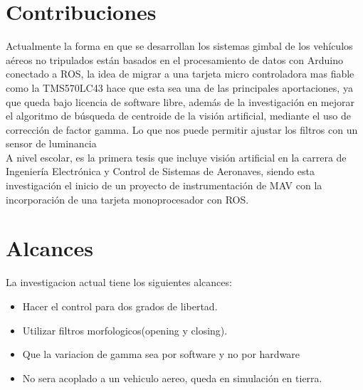 \section{Contribuciones}
Actualmente la forma en que se desarrollan los sistemas gimbal de los vehículos aéreos no tripulados están basados en el procesamiento
de datos con Arduino conectado a ROS, la idea de migrar a una tarjeta micro controladora mas fiable como la TMS570LC43 hace que esta sea una
de las principales aportaciones, ya que queda bajo licencia de software libre, además de la investigación en mejorar el algoritmo de búsqueda
de centroide de la visión artificial, mediante el uso de corrección de factor gamma. Lo que nos puede permitir ajustar los filtros con un sensor 
de luminancia\\
A nivel escolar, es la primera tesis que incluye visión artificial en la carrera de Ingeniería Electrónica y Control de Sistemas de Aeronaves, 
siendo esta investigación el inicio de un proyecto de instrumentación de MAV con la incorporación de una tarjeta monoprocesador con ROS.

\section{Alcances}
La investigacion actual tiene los siguientes alcances:
\begin{itemize}
	\item Hacer el control para dos grados de libertad.
	\item Utilizar filtros morfologicos(opening y closing).
	\item Que la variacion de gamma sea por software y no por hardware
	\item No sera acoplado a un vehiculo aereo, queda en simulación en tierra.
\end{itemize}


